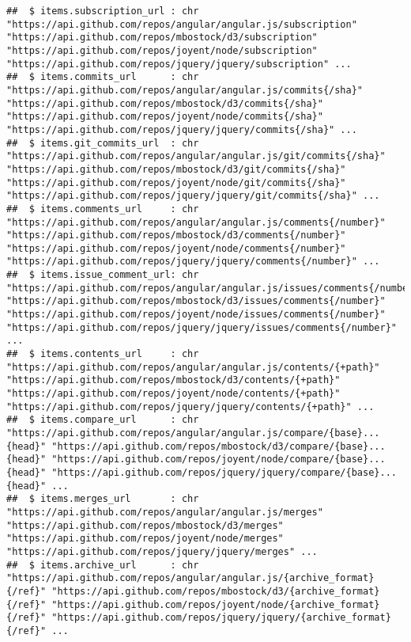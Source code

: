 \documentclass{article}\usepackage[]{graphicx}\usepackage[]{color}
\makeatletter
\newenvironment{kframe}{%
 \def\at@end@of@kframe{}%
 \ifinner\ifhmode%
  \def\at@end@of@kframe{\end{minipage}}%
  \begin{minipage}{\columnwidth}%
 \fi\fi%
 \def\FrameCommand##1{\hskip\@totalleftmargin \hskip-\fboxsep
 \colorbox{shadecolor}{##1}\hskip-\fboxsep
     \hskip-\linewidth \hskip-\@totalleftmargin \hskip\columnwidth}%
 \MakeFramed {\advance\hsize-\width
   \@totalleftmargin\z@ \linewidth\hsize
   \@setminipage}}%
 {\par\unskip\endMakeFramed%
 \at@end@of@kframe}
\newenvironment{knitrout}{}{} %
\makeatother
\begin{document}
\begin{knitrout}
\begin{kframe}
\begin{verbatim}
##  $ items.subscription_url : chr  "https://api.github.com/repos/angular/angular.js/subscription" "https://api.github.com/repos/mbostock/d3/subscription" "https://api.github.com/repos/joyent/node/subscription" "https://api.github.com/repos/jquery/jquery/subscription" ...
##  $ items.commits_url      : chr  "https://api.github.com/repos/angular/angular.js/commits{/sha}" "https://api.github.com/repos/mbostock/d3/commits{/sha}" "https://api.github.com/repos/joyent/node/commits{/sha}" "https://api.github.com/repos/jquery/jquery/commits{/sha}" ...
##  $ items.git_commits_url  : chr  "https://api.github.com/repos/angular/angular.js/git/commits{/sha}" "https://api.github.com/repos/mbostock/d3/git/commits{/sha}" "https://api.github.com/repos/joyent/node/git/commits{/sha}" "https://api.github.com/repos/jquery/jquery/git/commits{/sha}" ...
##  $ items.comments_url     : chr  "https://api.github.com/repos/angular/angular.js/comments{/number}" "https://api.github.com/repos/mbostock/d3/comments{/number}" "https://api.github.com/repos/joyent/node/comments{/number}" "https://api.github.com/repos/jquery/jquery/comments{/number}" ...
##  $ items.issue_comment_url: chr  "https://api.github.com/repos/angular/angular.js/issues/comments{/number}" "https://api.github.com/repos/mbostock/d3/issues/comments{/number}" "https://api.github.com/repos/joyent/node/issues/comments{/number}" "https://api.github.com/repos/jquery/jquery/issues/comments{/number}" ...
##  $ items.contents_url     : chr  "https://api.github.com/repos/angular/angular.js/contents/{+path}" "https://api.github.com/repos/mbostock/d3/contents/{+path}" "https://api.github.com/repos/joyent/node/contents/{+path}" "https://api.github.com/repos/jquery/jquery/contents/{+path}" ...
##  $ items.compare_url      : chr  "https://api.github.com/repos/angular/angular.js/compare/{base}...{head}" "https://api.github.com/repos/mbostock/d3/compare/{base}...{head}" "https://api.github.com/repos/joyent/node/compare/{base}...{head}" "https://api.github.com/repos/jquery/jquery/compare/{base}...{head}" ...
##  $ items.merges_url       : chr  "https://api.github.com/repos/angular/angular.js/merges" "https://api.github.com/repos/mbostock/d3/merges" "https://api.github.com/repos/joyent/node/merges" "https://api.github.com/repos/jquery/jquery/merges" ...
##  $ items.archive_url      : chr  "https://api.github.com/repos/angular/angular.js/{archive_format}{/ref}" "https://api.github.com/repos/mbostock/d3/{archive_format}{/ref}" "https://api.github.com/repos/joyent/node/{archive_format}{/ref}" "https://api.github.com/repos/jquery/jquery/{archive_format}{/ref}" ...

\end{verbatim}
\end{kframe}
\end{knitrout}
\end{document}
